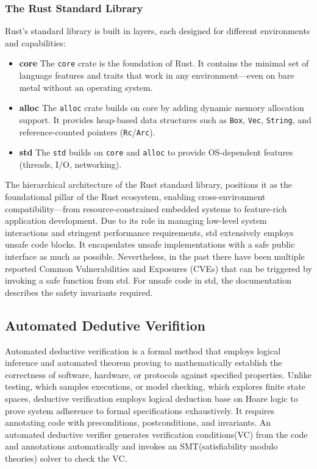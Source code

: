 \documentclass[conference]{IEEEtran}
\begin{document}
\subsubsection{The Rust Standard Library}
Rust’s standard library is built in layers, each designed for different environments and capabilities:
\begin{itemize}
        \item \textbf{core} The \texttt{core} crate is the foundation of Rust. It contains the minimal set of language features and traits that work in any environment—even on bare metal without an operating system.
        \item \textbf{alloc} The \texttt{alloc} crate builds on core by adding dynamic memory allocation support. It provides heap-based data structures such as \texttt{Box}, \texttt{Vec}, \texttt{String}, and reference-counted pointers (\texttt{Rc}/\texttt{Arc}).
        \item \textbf{std} The \texttt{std} builds on \texttt{core} and \texttt{alloc} to provide OS-dependent features (threads, I/O, networking).
\end{itemize}

The hierarchical architecture of the Rust standard library, positions it as the foundational pillar of the Rust ecosystem, enabling cross-environment compatibility—from resource-constrained embedded systems to feature-rich application development. Due to its role in managing low-level system interactions and stringent performance requirements, std extensively employs unsafe code blocks. It encapsulates unsafe implementations with a safe public interface as much as possible. Nevertheless, in the past there have been multiple reported Common Vulnerabilities and Exposures (CVEs)\cite{Qwaz_rust-cve} that can be triggered by invoking a safe function from std. For unsafe code in std, the documentation describes the safety invariants required.   

\subsection{Automated Dedutive Verifition}
Automated deductive verification is a formal method that employs logical inference and automated theorem proving to mathematically establish the correctness of software, hardware, or protocols against specified properties. Unlike testing, which samples executions, or model checking, which explores finite state spaces, deductive verification employs logical deduction base on Hoare logic to prove system adherence to formal specifications exhaustively. It requires annotating code with preconditions, postconditions, and invariants. An automated deductive verifier generates verification conditions(VC) from the code and annotations automatically and invokes an SMT(satisfiability modulo theories) solver to check the VC.
\end{document}
